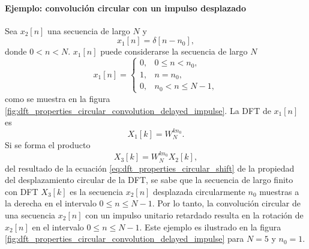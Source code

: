 \documentclass[a4paper]{report}
\begin{document}
\paragraph{Ejemplo: convolución circular con un impulso desplazado} Sea \(x_2[n]\) una secuencia de largo \(N\) y 
\[
 x_1[n]=\delta[n-n_0],
\]
donde \(0<n<N\). \(x_1[n]\) puede considerarse la secuencia de largo \(N\)
\[
 x_1[n]=
 \left\{ 
 \begin{array}{ll}
  0, & 0\leq n<n_0,\\
  1, & n=n_0,\\
  0, & n_0<n\leq N-1,
 \end{array}
 \right.
\]
como se muestra en la figura \ref{fig:dft_properties_circular_convolution_delayed_impulse}. La DFT de \(x_1[n]\) es
\[
 X_1[k]=W_N^{kn_0}.
\]
Si se forma el producto 
\[
 X_3[k]=W_N^{kn_0}X_2[k],
\]
del resultado de la ecuación \ref{eq:dft_properties_circular_shift} de la propiedad del desplazamiento circular de la DFT, se sabe que la secuencia de largo finito con DFT \(X_3[k]\) es la secuencia \(x_2[n]\) desplazada circularmente \(n_0\) muestras a la derecha en el intervalo \(0\leq n\leq N-1\). Por lo tanto, la convolución circular de una secuencia \(x_2[n]\) con un impulso unitario retardado resulta en la rotación de \(x_2[n]\) en el intervalo \(0\leq n\leq N-1\). Este ejemplo es ilustrado en la figura \ref{fig:dft_properties_circular_convolution_delayed_impulse} para \(N=5\) y \(n_0=1\).
\end{document}
